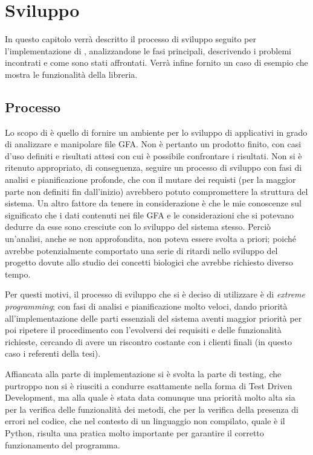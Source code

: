 \chapter{Sviluppo}
In questo capitolo verrà descritto il processo di sviluppo
seguito per l'implementazione di \pygfa, analizzandone le
fasi principali, descrivendo i problemi incontrati e come sono stati
affrontati. Verrà infine fornito un caso di esempio che mostra
le funzionalità della libreria.

\section{Processo}
Lo scopo di \pygfa è quello di fornire un ambiente per lo sviluppo
di applicativi in grado di analizzare e manipolare file GFA. Non
è pertanto un prodotto finito, con casi d'uso definiti e risultati attesi
con cui è possibile confrontare i risultati. Non si è ritenuto appropriato,
di conseguenza, seguire un processo di sviluppo con fasi di analisi
e pianificazione profonde, che con il mutare dei requisti (per la
maggior parte non definiti fin dall'inizio) avrebbero potuto
compromettere la struttura del sistema. Un altro fattore da
tenere in considerazione è che le mie conoscenze sul significato
che i dati contenuti nei file GFA e le considerazioni che si potevano dedurre
da esse sono cresciute con lo sviluppo del sistema stesso. Perciò un'analisi,
anche se non approfondita, non poteva essere svolta a priori; poiché
avrebbe potenzialmente comportato una serie di ritardi
nello sviluppo del progetto dovute allo studio dei concetti biologici
che avrebbe richiesto diverso tempo.


Per questi motivi, il processo di sviluppo che si è deciso di utilizzare è di \emph{extreme}
\emph{programming}; con fasi di analisi e pianificazione molto veloci,
dando priorità all'implementazione delle parti essenziali del sistema aventi
maggior priorità per poi ripetere il procedimento con l'evolversi dei
requisiti e delle funzionalità richieste, cercando di avere un riscontro
costante con i clienti finali (in questo caso i referenti della tesi).

Affiancata alla parte di implementazione si è svolta la parte di testing,
che purtroppo non si è riusciti a condurre esattamente nella forma di Test Driven
Development, ma alla quale è stata data comunque una priorità molto alta
sia per la verifica delle funzionalità dei metodi, che per la verifica della
presenza di errori nel codice, che nel contesto di un linguaggio non compilato,
quale è il Python, risulta una pratica molto importante per garantire il
corretto funzionamento del programma.

